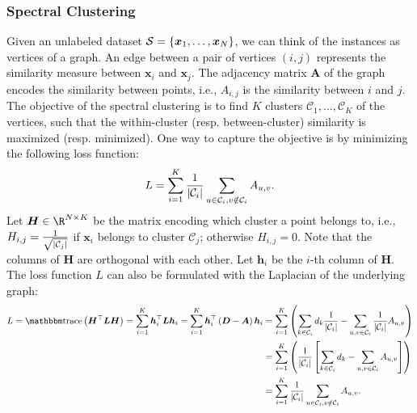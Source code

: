 {    \subsubsection{Spectral Clustering}
        Given an unlabeled dataset $\mathcal{S}=\{ \bm{x}_1, \ldots, \bm{x}_N \}$, we can think of the \ndata instances as \ndata vertices of a graph.
        An edge between a pair of vertices $(i, j)$ represents the similarity measure between $\bm{x}_i$ and $\bm{x}_j$.
        The adjacency matrix $\bm{A}$ of the graph encodes the similarity between points, i.e., $A_{i,j}$ is the similarity between $i$ and $j$.
        The objective of the spectral clustering is to find $K$ clusters $\mathcal{C}_1, \ldots, \mathcal{C}_K$ of the vertices, such that the within-cluster (resp. between-cluster) similarity is maximized (resp. minimized).
        One way to capture the objective is by minimizing the following loss function:
            \begin{equation}
                L = \sum_{i=1}^{K}{\frac{1}{| \mathcal{C}_i |} \sum_{u \in \mathcal{C}_i, v \notin \mathcal{C}_i}^{}{A_{u, v}}}.
            \end{equation}
        Let $\bm{H} \in \R^{\ndata \times K}$ be the matrix encoding which cluster a point belongs to, i.e., $H_{i,j}=\frac{1}{\sqrt{| \mathcal{C}_j |}}$ if $\bm{x}_i$ belongs to cluster $\mathcal{C}_j$; otherwise $H_{i,j}=0$.
        Note that the columns of $\bm{H}$ are orthogonal with each other. 
        Let $\bm{h}_i$ be the $i$-th column of $\bm{H}$.
        The loss function $L$ can also be formulated with the Laplacian of the underlying graph:
            \begin{equation}
                \begin{aligned}
                    L  = \Tr\left( \bm{H}^\top \bm{L} \bm{H}  \right) = \sum_{i=1}^{K}{\bm{h}_i^\top \bm{L} \bm{h}_i} 
                      = \sum_{i=1}^{K}{\bm{h}_i^\top \left( \bm{D} - \bm{A} \right) \bm{h}_i} & = \sum_{i=1}^{K}{\left(   \sum_{k \in \mathcal{C}_i}^{}{d_k \frac{1}{\SetCard{\mathcal{C}_i}}} - \sum_{u, v \in \mathcal{C}_i}^{}{\frac{1}{\SetCard{\mathcal{C}_i}}A_{u, v}} 
                      \right)} \\
                      & =   \sum_{i=1}^{K}{\left( \frac{1}{\SetCard{\mathcal{C}_i}} \left[ \sum_{k \in \mathcal{C}_i}^{}{d_k} - \sum_{u, v \in \mathcal{C}_i}^{}{A_{u, v}} \right] \right)} \\
                      & = \sum_{i=1}^{K}{\frac{1}{\SetCard{\mathcal{C}_i}} \sum_{u \in \mathcal{C}_i, v\notin \mathcal{C}_i}^{}{A_{u,v}}}.

\end{aligned}
\end{equation}}
